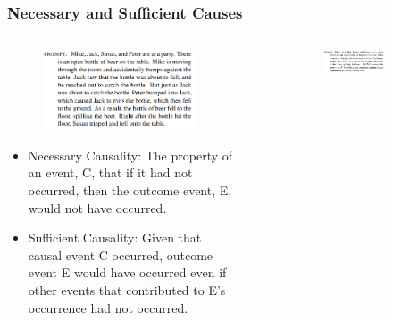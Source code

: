 \documentclass{beamer}
\begin{document}
\begin{frame}
	\frametitle{Necessary and Sufficient Causes}
	\begin{columns}
		\begin{column}{0.5 \textwidth}
			\begin{figure}
				\centering
				\includegraphics[scale=0.2]{imgs/necessary_story.png}
			\end{figure}
			\begin{itemize}
				\item \footnotesize Necessary Causality: The
					property of an event, C, that if it had
					not occurred, then the outcome event,
					E, would not have occurred.
				\item \footnotesize Sufficient
					Causality: Given that causal event C
					occurred, outcome event E would have
					occurred even if other events that
					contributed to E's occurrence had not
					occurred.
			\end{itemize}
		\end{column}
		\begin{column}{0.5 \textwidth}
			\begin{figure}
				\begin{subfigure}{\textwidth}
					\centering
					\includegraphics[scale=0.2]{imgs/necessary_prompt_1.png}
				\end{subfigure}
				\begin{subfigure}{\textwidth}

\end{subfigure}
\end{figure}
\end{column}
\end{columns}
\end{frame}
\end{document}
